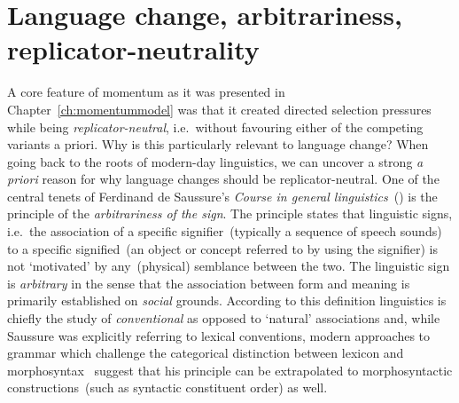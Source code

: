 

\section{Language change, arbitrariness, replicator-neutrality}
\label{sec:arbitrariness}

A core feature of momentum as it was presented in Chapter~\ref{ch:momentummodel} was that it created directed selection pressures while being \emph{replicator-neutral}, i.e.~without favouring either of the competing variants a priori. Why is this particularly relevant to language change?
When going back to the roots of modern-day linguistics, we can uncover a strong \emph{a priori} reason for why language changes should be replicator-neutral. One of the central tenets of Ferdinand de Saussure's \emph{Course in general linguistics}~(\citeyear{Saussure1959}) is the principle of the \emph{arbitrariness of the sign}. The principle states that linguistic signs, i.e.~the association of a specific signifier~(typically a sequence of speech sounds) to a specific signified~(an object or concept referred to by using the signifier) is not `motivated' by any~(physical) semblance between the two. The linguistic sign is \emph{arbitrary} in the sense that the association between form and meaning is primarily established on \emph{social} grounds.
According to this definition linguistics is chiefly the study of \emph{conventional} as opposed to `natural' associations and, while Saussure was explicitly referring to lexical conventions, modern approaches to grammar which challenge the categorical distinction between lexicon and morphosyntax~\citep[e.g.~Construction Grammar, ][]{Goldberg1995} suggest that his principle can be extrapolated to morphosyntactic constructions~(such as syntactic constituent order) as well.

